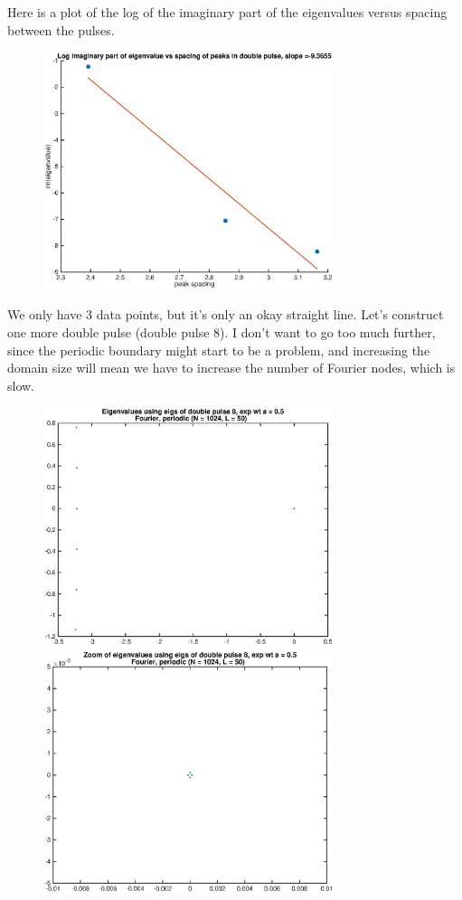 \documentclass[12pt]{article}
\begin{document}
Here is a plot of the log of the imaginary part of the eigenvalues versus spacing between the pulses.
\begin{figure}[H]
\includegraphics[width=8.5cm]{logimagspacing.eps}
\end{figure}
We only have 3 data points, but it's only an okay straight line. Let's construct one more double pulse (double pulse 8). I don't want to go too much further, since the periodic boundary might start to be a problem, and increasing the domain size will mean we have to increase the number of Fourier nodes, which is slow.

\begin{figure}[H]
\includegraphics[width=8.5cm]{fourierD8eigs.eps}
\includegraphics[width=8.5cm]{fourierD8eigszoom.eps}
\end{figure}
\end{document}
